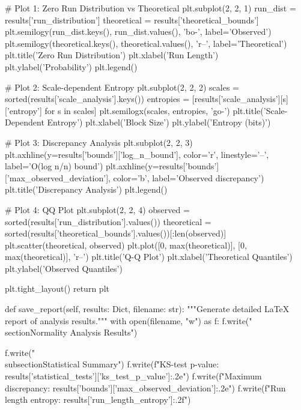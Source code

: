         # Plot 1: Zero Run Distribution vs Theoretical
        plt.subplot(2, 2, 1)
        run_dist = results['run_distribution']
        theoretical = results['theoretical_bounds']
        plt.semilogy(run_dist.keys(), run_dist.values(), 'bo-', label='Observed')
        plt.semilogy(theoretical.keys(), theoretical.values(), 'r--', label='Theoretical')
        plt.title('Zero Run Distribution')
        plt.xlabel('Run Length')
        plt.ylabel('Probability')
        plt.legend()
        
        # Plot 2: Scale-dependent Entropy
        plt.subplot(2, 2, 2)
        scales = sorted(results['scale_analysis'].keys())
        entropies = [results['scale_analysis'][s]['entropy'] for s in scales]
        plt.semilogx(scales, entropies, 'go-')
        plt.title('Scale-Dependent Entropy')
        plt.xlabel('Block Size')
        plt.ylabel('Entropy (bits)')
        
        # Plot 3: Discrepancy Analysis
        plt.subplot(2, 2, 3)
        plt.axhline(y=results['bounds']['log_n_bound'], color='r', linestyle='--',
                   label='O(log n/n) bound')
        plt.axhline(y=results['bounds']['max_observed_deviation'], color='b', 
                   label='Observed discrepancy')
        plt.title('Discrepancy Analysis')
        plt.legend()
        
        # Plot 4: QQ Plot
        plt.subplot(2, 2, 4)
        observed = sorted(results['run_distribution'].values())
        theoretical = sorted(results['theoretical_bounds'].values())[:len(observed)]
        plt.scatter(theoretical, observed)
        plt.plot([0, max(theoretical)], [0, max(theoretical)], 'r--')
        plt.title('Q-Q Plot')
        plt.xlabel('Theoretical Quantiles')
        plt.ylabel('Observed Quantiles')
        
        plt.tight_layout()
        return plt

    def save_report(self, results: Dict, filename: str):
        """Generate detailed LaTeX report of analysis results."""
        with open(filename, "w") as f:
            f.write("\\section{Normality Analysis Results}\n\n")
            
            f.write("\\subsection{Statistical Summary}\n")
            f.write(f"KS-test p-value: {results['statistical_tests']['ks_test_p_value']:.2e}\n")
            f.write(f"Maximum discrepancy: {results['bounds']['max_observed_deviation']:.2e}\n")
            f.write(f"Run length entropy: {results['run_length_entropy']:.2f}\n\n")
            
